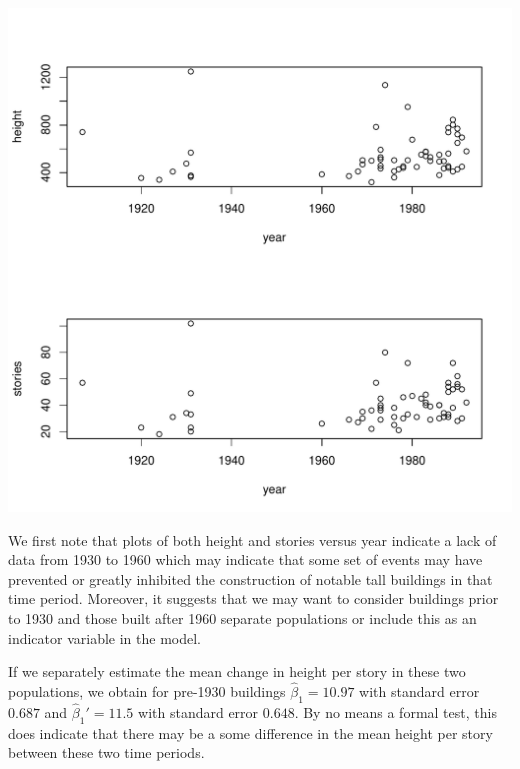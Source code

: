 \documentclass{homework}
\begin{document}
\begin{solution}
\begin{minipage}{.4\textwidth}
\includegraphics[width=.8\textwidth]{building_timeseries.pdf}
\end{minipage}
\begin{minipage}{.5\textwidth}
We first note that plots of both height and stories versus year indicate a lack
of data from 1930 to 1960 which may indicate that some set of events may have
prevented or greatly inhibited the construction of notable tall buildings in
that time period.  Moreover, it suggests that we may want to consider buildings
prior to 1930 and those built after 1960 separate populations or include this
as an indicator variable in the model.
\end{minipage}
If we separately estimate the mean change in height per story in these two
populations, we obtain for pre-1930 buildings $\hat \beta_1 = 10.97$ with
standard error $0.687$ and $\hat \beta_1' = 11.5$ with standard error $0.648$.
By no means a formal test, this does indicate that there may be a some
difference in the mean height per story between these two time periods.
\end{solution}
\newpage

\end{document}
